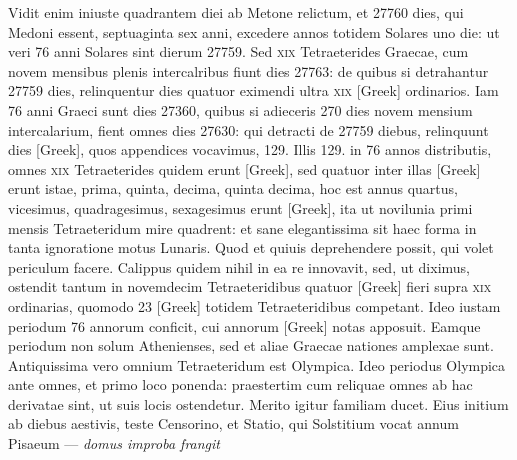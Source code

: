 Vidit enim iniuste quadrantem diei ab Metone relictum, et
27760 dies, qui Medoni essent, septuaginta sex anni, excedere annos
totidem Solares uno die: ut veri 76 anni Solares sint dierum 27759.
Sed \textsc{xix} Tetraeterides Graecae, cum novem mensibus
 plenis intercalribus
fiunt dies 27763: de quibus si detrahantur 27759 dies, relinquentur
dies quatuor eximendi ultra \textsc{xix} \textgreek{[Greek]} ordinarios.
Iam
76 anni Graeci sunt dies 27360, quibus si adieceris 270 dies novem
mensium intercalarium, fient omnes dies 27630: qui detracti de
27759 diebus, relinquunt dies \textgreek{[Greek]},
 quos appendices vocavimus,
129.
Illis 129. in 76 annos distributis, omnes \textsc{xix}
 Tetraeterides quidem
erunt \textgreek{[Greek]}, sed quatuor inter illas
 \textgreek{[Greek]} erunt istae,
prima, quinta, decima, quinta decima, hoc est annus quartus, vicesimus,
quadragesimus, sexagesimus erunt \textgreek{[Greek]}, ita ut novilunia primi
mensis Tetraeteridum mire quadrent: et sane elegantissima sit haec
forma in tanta ignoratione motus Lunaris.
Quod et quiuis deprehendere
possit, qui volet periculum facere.
Calippus quidem nihil in
ea re innovavit, sed, ut diximus, ostendit tantum in novemdecim Tetraeteridibus
quatuor \textgreek{[Greek]} fieri supra \textsc{xix} ordinarias, quomodo 23
\textgreek{[Greek]} totidem Tetraeteridibus competant.
Ideo iustam periodum
76 annorum conficit, cui annorum \textgreek{[Greek]} notas
apposuit.
Eamque periodum non solum Athenienses, sed et aliae
Graecae nationes amplexae sunt.
Antiquissima vero omnium Tetraeteridum
est Olympica.
Ideo periodus Olympica ante omnes, et primo
loco ponenda: praestertim cum reliquae omnes ab hac derivatae sint, ut
suis locis ostendetur.
Merito igitur familiam ducet.
Eius initium ab diebus
aestivis, teste Censorino, et Statio, qui Solstitium vocat annum
Pisaeum \hspace{10mm}--- \emph{domus improba frangit}

